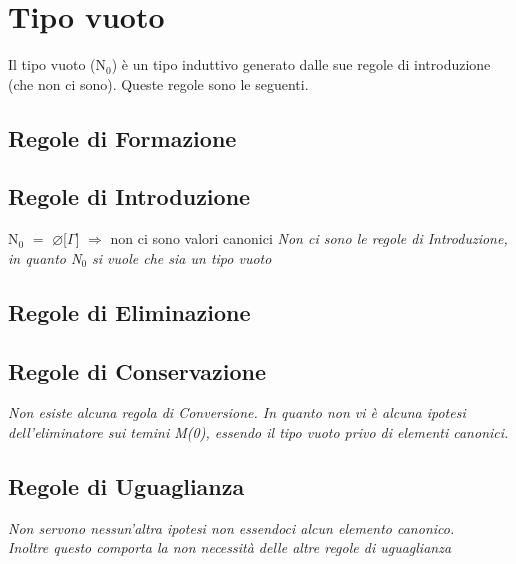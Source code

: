 \chapter{Tipo vuoto}
\label{cap: N0}
Il tipo vuoto (N$_0$) \`e un tipo induttivo generato dalle sue regole di introduzione (che non ci sono). Queste regole sono le seguenti.

\section{Regole di Formazione}
\label{sec: formazione-N0}
\begin{prooftree}
\end{prooftree}

\section{Regole di Introduzione}
\label{sec: introduzione-N0}
N$_0$ $=$ $\varnothing$[$\Gamma$] $\Rightarrow$ non ci sono valori canonici
\textit{Non ci sono le regole di Introduzione, in quanto N$_0$ si vuole che sia un tipo vuoto}

\section{Regole di Eliminazione}
\label{sec: eliminazione-N0}
\begin{prooftree}
\end{prooftree}

\section{Regole di Conservazione}
\label{sec: conservazione-funzione}
\textit{Non esiste alcuna regola di Conversione. In quanto non vi \`e alcuna ipotesi dell'eliminatore sui temini M(0), essendo il tipo vuoto privo di elementi canonici.}

\section{Regole di Uguaglianza}
\label{sec: uguaglianza-funzione}
\begin{prooftree}
\end{prooftree}
\noindent
\textit{Non servono nessun'altra ipotesi non essendoci alcun elemento canonico.\\ Inoltre questo comporta la non necessit\`a delle altre regole di uguaglianza}

